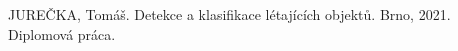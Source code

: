 

\begin{thebibliography}{99}
	
		JUREČKA, Tomáš. Detekce a klasifikace létajících objektů. Brno, 2021. Diplomová práca.

%  
%  
%  
%  
%  
%  
%  
%  
%  
\end{thebibliography}


